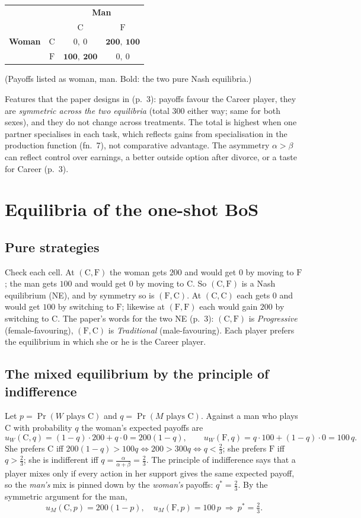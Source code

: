 \documentclass[11pt,a4paper]{article}
\newcommand{\C}{\mathrm{C}}
\newcommand{\Fm}{\mathrm{F}}
\begin{document}
\begin{center}
\begin{tabular}{cc|cc}
 & & \multicolumn{2}{c}{\textbf{Man}}\\
 & & $\C$ & $\Fm$ \\ \hline
\textbf{Woman} & $\C$ & $0,\ 0$ & $\mathbf{200},\ \mathbf{100}$ \\
 & $\Fm$ & $\mathbf{100},\ \mathbf{200}$ & $0,\ 0$ \\
\end{tabular}
\end{center}
(Payoffs listed as woman, man. Bold: the two pure Nash equilibria.)

Features that the paper designs in (p.~3): payoffs favour the Career player, they are
\emph{symmetric across the two equilibria} (total 300 either way; same for both sexes), and they
do not change across treatments. The total is highest when one partner specialises in each task,
which reflects gains from specialisation in the production function (fn.~7), not comparative
advantage. The asymmetry $\alpha>\beta$ can reflect control over earnings, a better outside
option after divorce, or a taste for Career (p.~3).

\section{Equilibria of the one-shot BoS}

\subsection{Pure strategies}
Check each cell. At $(\C,\Fm)$ the woman gets $200$ and would get $0$ by moving to $\Fm$; the man
gets $100$ and would get $0$ by moving to $\C$. So $(\C,\Fm)$ is a Nash equilibrium (NE), and by
symmetry so is $(\Fm,\C)$. At $(\C,\C)$ each gets $0$ and would get $100$ by switching to $\Fm$;
likewise at $(\Fm,\Fm)$ each would gain $200$ by switching to $\C$. The paper's words for the two
NE (p.~3): $(\C,\Fm)$ is \emph{Progressive} (female-favouring), $(\Fm,\C)$ is \emph{Traditional}
(male-favouring). Each player prefers the equilibrium in which she or he is the Career player.

\subsection{The mixed equilibrium by the principle of indifference}
Let $p=\Pr(W\text{ plays }\C)$ and $q=\Pr(M\text{ plays }\C)$. Against a man who plays $\C$ with
probability $q$ the woman's expected payoffs are
\[
u_W(\C,q)=(1-q)\cdot 200+q\cdot 0=200(1-q),\qquad
u_W(\Fm,q)=q\cdot 100+(1-q)\cdot 0=100\,q .
\]
She prefers $\C$ iff $200(1-q)>100q\iff 200>300q\iff q<\tfrac23$; she prefers $\Fm$ iff
$q>\tfrac23$; she is indifferent iff $q=\tfrac{\alpha}{\alpha+\beta}=\tfrac23$. The principle of
indifference says that a player mixes only if every action in her support gives the same
expected payoff, so the \emph{man's} mix is pinned down by the \emph{woman's} payoffs:
$q^*=\tfrac23$. By the symmetric argument for the man,
\[
u_M(\C,p)=200(1-p),\quad u_M(\Fm,p)=100\,p\ \Rightarrow\ p^*=\tfrac23 .
\]
\end{document}
